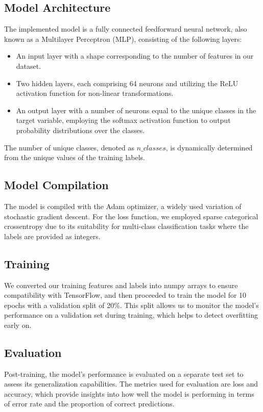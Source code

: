 \documentclass{report}
\begin{document}
\subsection{Model Architecture}
The implemented model is a fully connected feedforward neural network, also known as a Multilayer Perceptron (MLP), consisting of the following layers:

\begin{itemize}
    \item An input layer with a shape corresponding to the number of features in our dataset.
    \item Two hidden layers, each comprising 64 neurons and utilizing the ReLU activation function for non-linear transformations.
    \item An output layer with a number of neurons equal to the unique classes in the target variable, employing the softmax activation function to output probability distributions over the classes.
\end{itemize}

The number of unique classes, denoted as \( n\_classes \), is dynamically determined from the unique values of the training labels.

\subsection{Model Compilation}
The model is compiled with the Adam optimizer, a widely used variation of stochastic gradient descent. For the loss function, we employed sparse categorical crossentropy due to its suitability for multi-class classification tasks where the labels are provided as integers.

\subsection{Training}
We converted our training features and labels into numpy arrays to ensure compatibility with TensorFlow, and then proceeded to train the model for 10 epochs with a validation split of 20\%. This split allows us to monitor the model's performance on a validation set during training, which helps to detect overfitting early on.

\subsection{Evaluation}
Post-training, the model's performance is evaluated on a separate test set to assess its generalization capabilities. The metrics used for evaluation are loss and accuracy, which provide insights into how well the model is performing in terms of error rate and the proportion of correct predictions.
\end{document}
